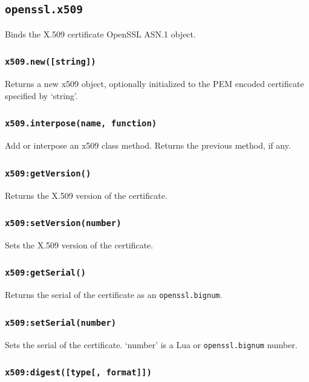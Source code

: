 \documentclass[11pt, oneside]{memoir}
\newcommand*{\fn}[1]{\texttt{#1}\xspace}
\newcommand*{\module}[1]{\texttt{#1}\xspace}
\newcounter{toccols}
\newenvironment{Module}[1]{
	\subsection{\texttt{#1}}
	\addtocontents{toc}{
		\protect\begin{multicols}{\value{toccols}}
	}
}{
	\addtocontents{toc}{\protect\end{multicols}}
}
\begin{document}
\begin{Module}{openssl.x509}

Binds the X.509 certificate OpenSSL ASN.1 object.

\subsubsection[\fn{x509.new}]{\fn{x509.new([string])}}

Returns a new x509 object, optionally initialized to the PEM encoded certificate specified by `string'.

\subsubsection[\fn{x509.interpose}]{\fn{x509.interpose(name, function)}}

Add or interpose an x509 class method. Returns the previous method, if any.

\subsubsection[\fn{x509:getVersion}]{\fn{x509:getVersion()}}

Returns the X.509 version of the certificate.

\subsubsection[\fn{x509:setVersion}]{\fn{x509:setVersion(number)}}

Sets the X.509 version of the certificate.

\subsubsection[\fn{x509:getSerial}]{\fn{x509:getSerial()}}

Returns the serial of the certificate as an \module{openssl.bignum}.

\subsubsection[\fn{x509:setSerial}]{\fn{x509:setSerial(number)}}

Sets the serial of the certificate. `number' is a Lua or \module{openssl.bignum} number.

\subsubsection[\fn{x509:digest}]{\fn{x509:digest([type[, format]])}}


\end{Module}
\end{document}

